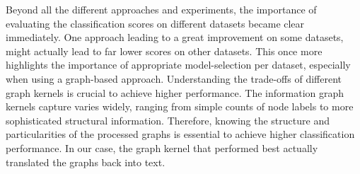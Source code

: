 Beyond all the different approaches and experiments, the importance of evaluating the classification scores on different datasets became clear immediately.
One approach leading to a great improvement on some datasets, might actually lead to far lower scores on other datasets.
This once more highlights the importance of appropriate model-selection per dataset, especially when using a graph-based approach.
Understanding the trade-offs of different graph kernels is crucial to achieve higher performance.
The information graph kernels capture varies widely, ranging from simple counts of node labels to more sophisticated structural information.
Therefore, knowing the structure and particularities of the processed graphs is essential to achieve higher classification performance.
In our case, the graph kernel that performed best actually translated the graphs back into text.

